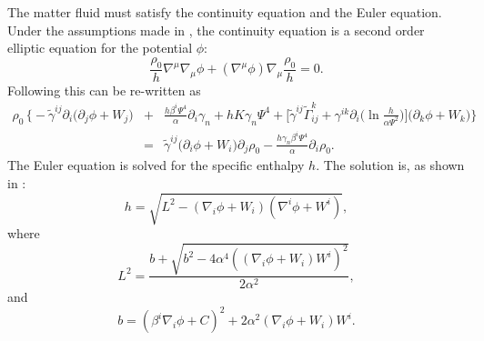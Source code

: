 The matter fluid must satisfy the continuity equation and the Euler
equation. 
Under the assumptions made in \cite{Tichy:2011gw}, the continuity equation is a second order elliptic equation for the potential $\phi$:
\begin{equation}
\label{eq:Continuity1}
\frac{\rho_0}{h}\nabla^{\mu}\nabla_{\mu}\phi+\left(\nabla^{\mu}\phi\right)\nabla_{\mu}\frac{\rho_0}{h}=0.
\end{equation}
Following \cite{Tichy:2011gw} this can be re-written as
\begin{eqnarray}
\label{eq:Continuity2}
\rho_0\,\bigg\{\!\!-\tilde{\gamma}^{ij}\partial_i\big(\partial_j\phi+W_j\big)  &+& \frac{h\beta^i\Psi^4}{\alpha}\partial_i\gamma_n + hK\gamma_n\Psi^4+\Big[\tilde{\gamma}^{ij}\tilde{\Gamma}^k_{ij}+\gamma^{ik}\partial_i\big(\ln \frac{h}{\alpha\Psi^2}\big)\Big] 
\big(\partial_k\phi+W_k\big) \bigg\} \nonumber\\
&=&\tilde{\gamma}^{ij}\big(\partial_i\phi+W_i\big)\partial_j\rho_0 - \frac{h\gamma_n\beta^i\Psi^4}{\alpha}\partial_i\rho_0.
\label{eq:Continuity}
\end{eqnarray}
The Euler equation is solved for the specific enthalpy $h$. The
solution is, as shown in \cite{Tichy:2011gw}:
\begin{equation}
h = \sqrt{L^2 -
  \left(\nabla_i\phi+W_i\right)\left(\nabla^i\phi+W^i\right)},
\end{equation}
where
\begin{equation}
L^2 =
\frac{b+\sqrt{b^2-4\alpha^4\left(\left(\nabla_i\phi+W_i\right)W^i\right)^2}}{2\alpha^2},
\end{equation}
and
\begin{equation}
b =
\left(\beta^i\nabla_i\phi+C\right)^2+2\alpha^2\left(\nabla_i\phi+W_i\right)W^i.
\end{equation}

